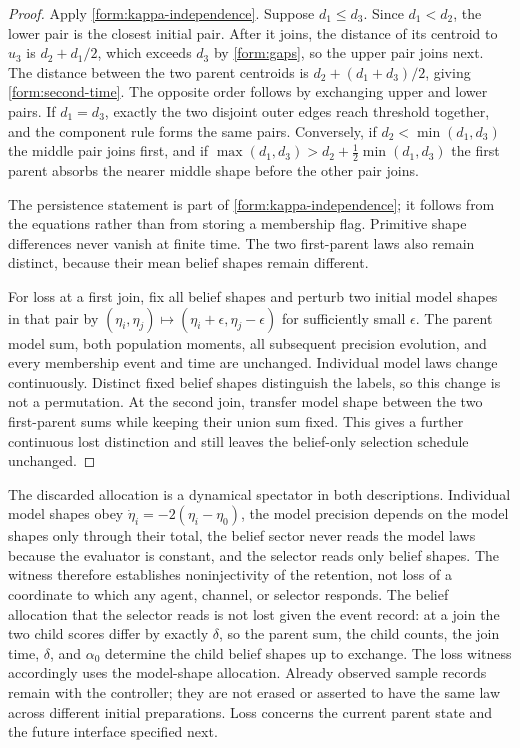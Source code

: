 \begin{proof}
Apply \cref{form:kappa-independence}. Suppose $d_1\le d_3$. Since $d_1<d_2$, the lower pair is the closest initial pair. After it joins, the distance of its centroid to $u_3$ is $d_2+d_1/2$, which exceeds $d_3$ by \cref{form:gaps}, so the upper pair joins next. The distance between the two parent centroids is $d_2+(d_1+d_3)/2$, giving \cref{form:second-time}. The opposite order follows by exchanging upper and lower pairs. If $d_1=d_3$, exactly the two disjoint outer edges reach threshold together, and the component rule forms the same pairs. Conversely, if $d_2<\min(d_1,d_3)$ the middle pair joins first, and if $\max(d_1,d_3)>d_2+\tfrac12\min(d_1,d_3)$ the first parent absorbs the nearer middle shape before the other pair joins.

The persistence statement is part of \cref{form:kappa-independence}; it follows from the equations rather than from storing a membership flag. Primitive shape
differences never vanish at finite time. The two first-parent laws also
remain distinct, because their mean belief shapes remain different.

For loss at a first join, fix all belief shapes and perturb two initial model
shapes in that pair by $(\eta_i,\eta_j)\mapsto
(\eta_i+\epsilon,\eta_j-\epsilon)$ for sufficiently small $\epsilon$.
The parent model sum, both population moments, all subsequent precision
evolution, and every membership event and time are unchanged. Individual
model laws change continuously. Distinct fixed belief shapes distinguish
the labels, so this change is not a permutation. At the second join, transfer
model shape between the two first-parent sums while keeping their union sum
fixed. This gives a further continuous lost distinction and still leaves
the belief-only selection schedule unchanged.
\end{proof}

The discarded allocation is a dynamical spectator in both descriptions. Individual model shapes obey $\dot\eta_i=-2(\eta_i-\eta_0)$, the model precision depends on the model shapes only through their total, the belief sector never reads the model laws because the evaluator is constant, and the selector reads only belief shapes. The witness therefore establishes noninjectivity of the retention, not loss of a coordinate to which any agent, channel, or selector responds. The belief allocation that the selector reads is not lost given the event record: at a join the two child scores differ by exactly $\delta$, so the parent sum, the child counts, the join time, $\delta$, and $\alpha_0$ determine the child belief shapes up to exchange. The loss witness accordingly uses the model-shape allocation. Already observed sample records remain with the controller; they
are not erased or asserted to have the same law across different initial
preparations. Loss concerns the current parent state and the future interface
specified next.

